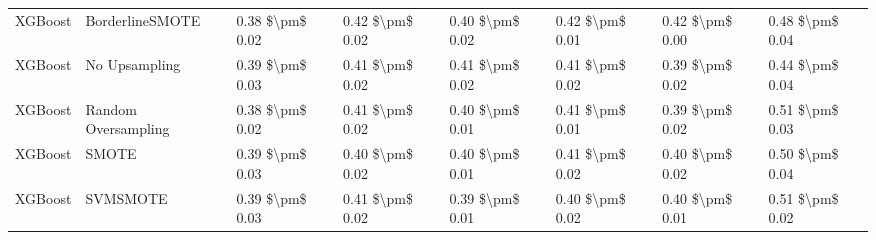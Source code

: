 \begin{tabular}{llllllll}
                        XGBoost &               BorderlineSMOTE & 0.38 \$\textbackslash pm\$ 0.02 &           0.42 \$\textbackslash pm\$ 0.02 &       0.40 \$\textbackslash pm\$ 0.02 &        0.42 \$\textbackslash pm\$ 0.01 &                         0.42 \$\textbackslash pm\$ 0.00 &     0.48 \$\textbackslash pm\$ 0.04 \\
                        XGBoost &                 No Upsampling & 0.39 \$\textbackslash pm\$ 0.03 &           0.41 \$\textbackslash pm\$ 0.02 &       0.41 \$\textbackslash pm\$ 0.02 &        0.41 \$\textbackslash pm\$ 0.02 &                         0.39 \$\textbackslash pm\$ 0.02 &     0.44 \$\textbackslash pm\$ 0.04 \\
                        XGBoost &           Random Oversampling & 0.38 \$\textbackslash pm\$ 0.02 &           0.41 \$\textbackslash pm\$ 0.02 &       0.40 \$\textbackslash pm\$ 0.01 &        0.41 \$\textbackslash pm\$ 0.01 &                         0.39 \$\textbackslash pm\$ 0.02 &     0.51 \$\textbackslash pm\$ 0.03 \\
                        XGBoost &                         SMOTE & 0.39 \$\textbackslash pm\$ 0.03 &           0.40 \$\textbackslash pm\$ 0.02 &       0.40 \$\textbackslash pm\$ 0.01 &        0.41 \$\textbackslash pm\$ 0.02 &                         0.40 \$\textbackslash pm\$ 0.02 &     0.50 \$\textbackslash pm\$ 0.04 \\
                        XGBoost &                      SVMSMOTE & 0.39 \$\textbackslash pm\$ 0.03 &           0.41 \$\textbackslash pm\$ 0.02 &       0.39 \$\textbackslash pm\$ 0.01 &        0.40 \$\textbackslash pm\$ 0.02 &                         0.40 \$\textbackslash pm\$ 0.01 &     0.51 \$\textbackslash pm\$ 0.02 \\
\bottomrule
\end{tabular}
